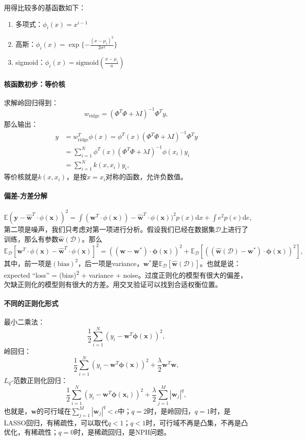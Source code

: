 用得比较多的基函数如下：
\begin{enumerate}
    \item 多项式：$\phi_i(x) = x^{i-1}$
    \item 高斯：$\phi_i(x) = \exp\{-\frac{(x-\mu_i)^2}{2\sigma^2}\}$
    \item sigmoid：$\phi_i(x) = \mathrm{sigmoid}(\frac{x - \mu_i}{a})$
\end{enumerate}

\paragraph{核函数初步：等价核}
求解岭回归得到：
$$w_\mathrm{ridge} = (\Phi^T\Phi + \lambda I)^{-1}\Phi^T y,$$
那么输出：
$$
\begin{aligned}
    \hat{y} &= w_\mathrm{ridge}^T\phi(x) = \phi^T(x)(\Phi^T\Phi + \lambda I)^{-1}\Phi^T y \\
    &= \sum_{i=1}^N \phi^T(x)(\Phi^T\Phi + \lambda I)^{-1}\phi(x_i) y_i\\
    &= \sum_{i=1}^N k(x, x_i)y_i,
\end{aligned}
$$
等价核就是$k(x, x_i)$，是按$x = x_i$对称的函数，允许负数值。

\paragraph{偏差-方差分解}
$\mathbb{E}(\bm y - \hat{\bm w}^T\cdot \phi(\bm x))^2 = \int ({\bm w}^T\cdot \phi(\bm x)) - \hat{\bm w}^T\cdot \phi(\bm x))^2p(x)\mathrm{d}x + \int e^2p(e)\mathrm{d}e,$
第二项是噪声，我们只考虑对第一项进行分析。假设我们已经在数据集$\mathcal{D}$上进行了训练，那么有参数$\hat{\bm w}(\mathcal{D})$。那么$\mathbb{E}_\mathcal{D}[{\bm w}^T\cdot \phi(\bm x) - \hat{\bm w}^T\cdot \phi(\bm x)]^2 = (({\bm w} - {\bm w}^*)\cdot \bm\phi(\bm x))^2 + \mathbb{E}_\mathcal{D}[((\hat{\bm w}(\mathcal{D}) - {\bm w}^*)\cdot \bm\phi(\bm x))^2],$其中，前一项是$(\text{bias})^2$，后一项是variance，${\bm w}^*$是$\mathbb{E}_\mathcal{D}[\hat{\bm w}(\mathcal{D})]$。也就是说：expected ``loss'' = (bias)\textsuperscript{2} + variance + noise。过度正则化的模型有很大的偏差，欠缺正则化的模型则有很大的方差。用交叉验证可以找到合适权衡位置。

\paragraph{不同的正则化形式} 最小二乘法：$$\frac{1}{2}\sum^N_{i=1}(y_i - \bm w^T\bm\phi(\bm x))^2,$$
岭回归：$$
\frac{1}{2}\sum^N_{i=1}(y_i - \bm w^T\bm\phi(\bm x))^2 + \frac{\lambda}{2}\bm w^T\bm w,$$
$L_q$-范数正则化回归：$$
\frac{1}{2}\sum^N_{i=1}(y_i - \bm w^T\bm\phi(\bm x_i))^2 + \frac{\lambda}{2}\sum_{j=1}^M |\bm w_j|^q,$$也就是，$\bm w$的可行域在$\sum_{j=1}^M |\bm w_j|^q < c$中；$q=2$时，是岭回归，$q=1$时，是LASSO回归，有稀疏性，可以取代$q<1$；$q<1$时，可行域不再是凸集，不再是凸优化，有稀疏性；$q=0$时，是稀疏回归，是NPH问题。


